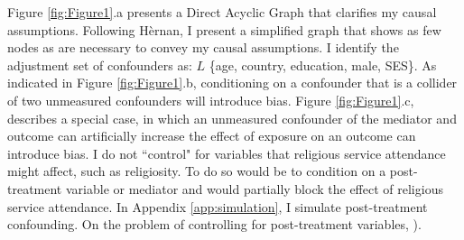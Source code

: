 \documentclass[]{interact}
\theoremstyle{plain}%
\theoremstyle{definition}
\theoremstyle{remark}
\begin{document}
Figure \ref{fig:Figure1}.a presents a Direct Acyclic Graph that clarifies my causal assumptions. Following H\`{e}rnan, I present a simplified graph that shows as few nodes as are necessary to convey my causal assumptions. I identify the adjustment set of confounders as: $L$ \{age, country, education, male, SES\}. As indicated in Figure \ref{fig:Figure1}.b, conditioning on a confounder that is a collider of two unmeasured confounders will introduce bias. Figure \ref{fig:Figure1}.c, describes a special case, in which an unmeasured confounder of the mediator and outcome can artificially increase the effect of exposure on an outcome can introduce bias. I do not “control" for variables that religious service attendance might affect, such as religiosity. To do so would be to condition on a post-treatment variable or mediator and would partially block the effect of religious service attendance. In Appendix \ref{app:simulation}, I simulate post-treatment confounding. On the problem of controlling for post-treatment variables, \citep[see:][]{westreich_table_2013}).  
\end{document}
